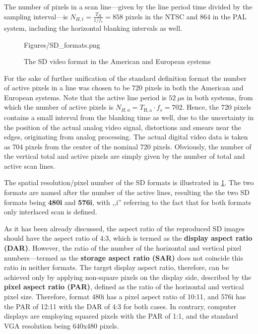 The number of pixels in a scan line---given by the line period time divided by the sampling interval---is $N_{H,t} = \frac{T_H}{1/f_s} = 858$ pixels in the NTSC and $864$ in the PAL system, including the horizontal blanking intervals as well.
%
\begin{figure}[]
	\centering
	\begin{overpic}[width = 0.65 \columnwidth ]{Figures/SD_formats.png}
	\end{overpic}
	\caption{The SD video format in the American and European systems}
	\label{Fig:SD_format}
\end{figure}
For the sake of further unification of the standard definition format the number of active pixels in a line was chosen to be 720 pixels in both the American and European systems.
Note that the active line period is $52~\mu \mathrm{s}$ in both systems, from which the number of active pixels is $N_{H,a} = T_{\mathrm{H,a}} \cdot f_s = 702$.
Hence, the 720 pixels contains a small interval from the blanking time as well, due to the uncertainty in the position of the actual analog video signal, distortions and smears near the edges, originating from analog processing.
The actual digital video data is taken as 704 pixels from the center of the nominal 720 pixels.
Obviously, the number of the vertical total and active pixels are simply given by the number of total and active scan lines.

The spatial resolution/pixel number of the SD formats is illustrated in \ref{Fig:SD_format}.
The two formats are named after the number of the active lines, resulting the the two SD formats being \textbf{480i} and \textbf{576i}, with ,,i'' referring to the fact that for both formats only interlaced scan is defined.

As it has been already discussed, the aspect ratio of the reproduced SD images should have the aspect ratio of 4:3, which is termed as the \textbf{display aspect ratio (DAR)}.
However, the ratio of the number of the horizontal and vertical pixel numbers---termed as the \textbf{storage aspect ratio (SAR)} does not coincide this ratio in neither formats.
The target display aspect ratio, therefore, can be achieved only by applying non-square pixels on the display side, described by the \textbf{pixel aspect ratio (PAR)}, defined as the ratio of the horizontal and vertical pixel size.
Therefore, format 480i has a pixel aspect ratio of 10:11, and 576i has the PAR of 12:11 with the DAR of 4:3 for both cases.
In contrary, computer displays are employing squared pixels with the PAR of 1:1, and the standard VGA resolution being 640x480 pixels.

